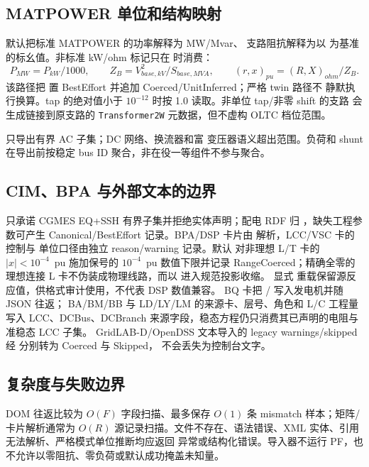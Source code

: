 \subsection{MATPOWER 单位和结构映射}
 默认把标准 MATPOWER 的功率解释为 MW/Mvar、
支路阻抗解释为以  为基准的标幺值。非标准 kW/ohm 标记只在
 时消费：
\begin{equation}
 P_{MW}=P_{kW}/1000,\qquad Z_B=V_{base,kV}^2/S_{base,MVA},\qquad
 (r,x)_{pu}=(R,X)_{ohm}/Z_B.
\end{equation}
该路径把  置 BestEffort 并追加 Coerced/UnitInferred；严格 twin 路径不
静默执行换算。tap 的绝对值小于 $10^{-12}$ 时按 1.0 读取。非单位 tap/非零 shift 的支路
会生成链接到原支路的 \texttt{Transformer2W} 元数据，但不虚构 OLTC 档位范围。

 只导出有界 AC 子集；DC 网络、换流器和富
变压器语义超出范围。负荷和 shunt 在导出前按稳定 bus ID 聚合，非在役一等组件不参与聚合。

\subsection{CIM、BPA 与外部文本的边界}
 只承诺 CGMES EQ+SSH 有界子集并拒绝实体声明；配电 RDF
归 ，缺失工程参数可产生 Canonical/BestEffort
记录。BPA/DSP 卡片由  解析，LCC/VSC 卡的控制与
单位口径由独立 reason/warning 记录。默认  对非理想 L/T 卡的
$|x|<10^{-4}$~pu 施加保号的 $10^{-4}$~pu 数值下限并记录 RangeCoerced；精确全零的
理想连接 L 卡不伪装成物理线路，而以  进入规范投影收缩。
显式  重载保留源反应值，供格式审计使用，不代表 DSP 数值兼容。
BQ 卡把 / 写入发电机并随 JSON 往返；
BA/BM/BB 与 LD/LY/LM 的来源卡、层号、角色和 L/C 工程量写入 LCC、DCBus、DCBranch
来源字段，稳态方程仍只消费其已声明的电阻与准稳态 LCC 子集。
GridLAB-D/OpenDSS 文本导入的 legacy warnings/skipped
经  分别转为 Coerced 与 Skipped，
不会丢失为控制台文字。

\subsection{复杂度与失败边界}
DOM 往返比较为 $O(F)$ 字段扫描、最多保存 $O(1)$ 条 mismatch 样本；矩阵/卡片解析通常为
$O(R)$ 源记录扫描。文件不存在、语法错误、XML 实体、引用无法解析、严格模式单位推断均应返回
异常或结构化错误。导入器不运行 PF，也不允许以零阻抗、零负荷或默认成功掩盖未知量。
